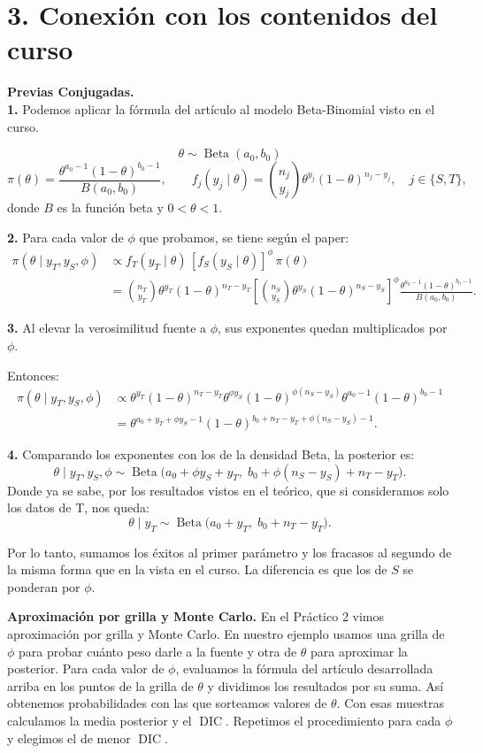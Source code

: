 \documentclass[10pt,a4paper]{article}
\newcommand{\BetaDist}{\operatorname{Beta}}
\newcommand{\DIC}{\operatorname{DIC}}
\newcommand{\etapa}[1]{\par\smallskip\textbf{#1.}\quad}
\begin{document}
\section{3. Conexión con los contenidos del curso}\label{sec:conexion}

\etapa{Previas Conjugadas}\\
\textbf{1.} Podemos aplicar la fórmula del artículo al modelo Beta-Binomial visto en el curso.

$$\theta\sim\BetaDist(a_0,b_0)$$
\[
\pi(\theta)=\frac{\theta^{a_0-1}(1-\theta)^{b_0-1}}{B(a_0,b_0)},
\qquad
f_j(y_j\mid\theta)=\binom{n_j}{y_j}\theta^{y_j}(1-\theta)^{n_j-y_j},
\quad j\in\{S,T\},
\]
donde $B$ es la función beta y $0<\theta<1$.

\textbf{2.} Para cada valor de $\phi$ que probamos, se tiene según el paper:
\[
\begin{aligned}
\pi(\theta\mid y_T,y_S,\phi)
&\propto f_T(y_T\mid\theta)\,[f_S(y_S\mid\theta)]^\phi\,\pi(\theta)\\
&=\binom{n_T}{y_T}\theta^{y_T}(1-\theta)^{n_T-y_T}
\left[\binom{n_S}{y_S}\theta^{y_S}(1-\theta)^{n_S-y_S}\right]^\phi
\frac{\theta^{a_0-1}(1-\theta)^{b_0-1}}{B(a_0,b_0)}.
\end{aligned}
\]

\textbf{3.} Al elevar la verosimilitud fuente a $\phi$, sus exponentes quedan multiplicados por $\phi$.

Entonces:
\[
\begin{aligned}
\pi(\theta\mid y_T,y_S,\phi)
&\propto \theta^{y_T}(1-\theta)^{n_T-y_T}
\theta^{\phi y_S}(1-\theta)^{\phi(n_S-y_S)}
\theta^{a_0-1}(1-\theta)^{b_0-1}\\
&=\theta^{a_0+y_T+\phi y_S-1}
(1-\theta)^{b_0+n_T-y_T+\phi(n_S-y_S)-1}.
\end{aligned}
\]

\textbf{4.} Comparando los exponentes con los de la densidad Beta, la posterior es:
\[
\theta\mid y_T,y_S,\phi \sim \BetaDist\bigl(a_0 + \phi y_S + y_T,\; b_0 + \phi(n_S-y_S) + n_T-y_T\bigr).
\]
Donde ya se sabe, por los resultados vistos en el teórico, que si consideramos solo los datos de T, nos queda:
\[
\theta\mid y_T \sim \BetaDist\bigl(a_0 + y_T,\; b_0 + n_T-y_T\bigr).
\]

Por lo tanto, sumamos los éxitos al primer parámetro y los fracasos al segundo de la misma forma que en la vista en el curso. La diferencia es que los de $S$ se ponderan por $\phi$.

\etapa{Aproximación por grilla y Monte Carlo}
En el Práctico 2 vimos aproximación por grilla y Monte Carlo. En nuestro ejemplo usamos una grilla de $\phi$ para probar cuánto peso darle a la fuente y otra de $\theta$ para aproximar la posterior. Para cada valor de $\phi$, evaluamos la fórmula del artículo desarrollada arriba en los puntos de la grilla de $\theta$ y dividimos los resultados por su suma. Así obtenemos probabilidades con las que sorteamos valores de $\theta$. Con esas muestras calculamos la media posterior y el $\DIC$. Repetimos el procedimiento para cada $\phi$ y elegimos el de menor $\DIC$.
\end{document}
